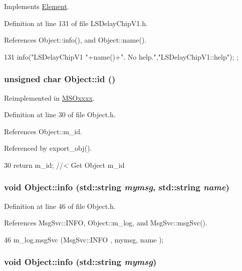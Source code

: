 Implements \hyperlink{classElement_a32c0de27acb08e17251cef88c3e9303a}{Element}.

Definition at line 131 of file LSDelayChipV1.h.

References Object::info(), and Object::name().


\begin{DoxyCode}
131 { info("LSDelayChipV1 "+name()+". No help.","LSDelayChipV1::help"); };
\end{DoxyCode}
\hypertarget{classObject_af99145335cc61ff6e2798ea17db009d2}{
\subsubsection[{id}]{\setlength{\rightskip}{0pt plus 5cm}unsigned char Object::id ()}}
\label{classObject_af99145335cc61ff6e2798ea17db009d2}


Reimplemented in \hyperlink{classMSOxxxx_a0f14b23d31d8e7647184e99a89600cc3}{MSOxxxx}.

Definition at line 30 of file Object.h.

References Object::m\_\-id.

Referenced by export\_\-obj().


\begin{DoxyCode}
30 { return m_id;         } //< Get Object m_id 
\end{DoxyCode}
\hypertarget{classObject_a1ca123253dfd30fc28b156f521dcbdae}{
\subsubsection[{info}]{\setlength{\rightskip}{0pt plus 5cm}void Object::info (std::string {\em mymsg}, \/  std::string {\em name})}}
\label{classObject_a1ca123253dfd30fc28b156f521dcbdae}


Definition at line 46 of file Object.h.

References MsgSvc::INFO, Object::m\_\-log, and MsgSvc::msgSvc().


\begin{DoxyCode}
46 { m_log.msgSvc (MsgSvc::INFO    , mymsg, name ); }
\end{DoxyCode}
\hypertarget{classObject_a644fd329ea4cb85f54fa6846484b84a8}{
\subsubsection[{info}]{\setlength{\rightskip}{0pt plus 5cm}void Object::info (std::string {\em mymsg})}}
\label{classObject_a644fd329ea4cb85f54fa6846484b84a8}


